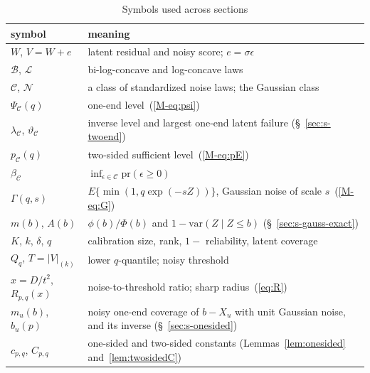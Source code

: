\documentclass[12pt]{article}
\renewcommand{\_}{\usc\allowbreak}
\theoremstyle{definition}
\numberwithin{equation}{section}
\newcommand{\pr}{\mathrm{pr}}
\newcommand{\LC}{\mathcal{L}}
\newcommand{\B}{\mathcal{B}}
\newcommand{\E}{\mathcal{C}}
\newcommand{\N}{\mathcal{N}}
\newcommand{\var}{\mathrm{var}}
\begin{document}
\begin{table}[htbp]
\renewcommand{\baselinestretch}{1}
\caption{Symbols used across sections}
\label{tab:s-notation}
\centering
\fontsize{9}{11pt}\selectfont
\begin{tabular}{p{2.6cm}p{9.6cm}}
\toprule
symbol & meaning \\
\midrule
$W$, $V = W + e$ & latent residual and noisy score; $e = \sigma\epsilon$ \\
$\B$, $\LC$ & bi-log-concave and log-concave laws \\
$\E$, $\N$ & a class of standardized noise laws; the Gaussian class \\
$\Psi_{\E}(q)$ & one-end level~(\ref{M-eq:psi}) \\
$\lambda_{\E}$, $\vartheta_{\E}$ & inverse level and largest one-end latent failure (\S~\ref{sec:s-twoend}) \\
$p_{\E}(q)$ & two-sided sufficient level~(\ref{M-eq:pE}) \\
$\beta_{\E}$ & $\inf_{\epsilon \in \E}\pr(\epsilon \ge 0)$ \\
$\Gamma(q, s)$ & $E\{\min(1, q\exp(-sZ))\}$, Gaussian noise of scale $s$~(\ref{M-eq:G}) \\
$m(b)$, $A(b)$ & $\phi(b)/\Phi(b)$ and $1 - \var(Z \mid Z \le b)$ (\S~\ref{sec:s-gauss-exact}) \\
$K$, $k$, $\delta$, $q$ & calibration size, rank, $1 -$ reliability, latent coverage \\
$Q_q$, $T = |V|_{(k)}$ & lower $q$-quantile; noisy threshold \\
$x = D/t^2$, $R_{p,q}(x)$ & noise-to-threshold ratio; sharp radius~(\ref{eq:R}) \\
$m_u(b)$, $b_u(p)$ & noisy one-end coverage of $b - X_u$ with unit Gaussian noise, and its inverse (\S~\ref{sec:s-onesided}) \\
$c_{p,q}$, $C_{p,q}$ & one-sided and two-sided constants (Lemmas~\ref{lem:onesided} and~\ref{lem:twosidedC}) \\
\bottomrule
\end{tabular}
\end{table}
\end{document}
